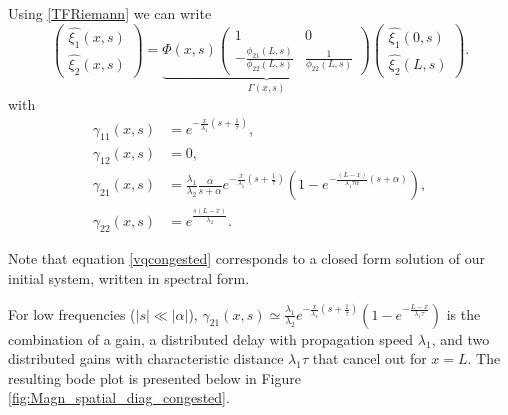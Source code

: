 \documentclass[preprint]{elsarticle}
\begin{document}
Using \eqref{TFRiemann} we can write 
\begin{equation} \label{vqcongested}
\begin{pmatrix}
\hat{\xi_{1}}(x,s)\\
\hat{\xi_{2}}(x,s)
\end{pmatrix} = \underbrace{
\Phi(x,s) \begin{pmatrix}
1 & 0\\
-\frac{\phi_{21}\left(L,s\right)}{\phi_{22}\left(L,s\right)} & \frac{1}{\phi_{22}\left(L,s\right)}
\end{pmatrix}}_\text{$\Gamma (x,s)$}
\begin{pmatrix}
\hat{\xi_{1}}\left(0,s\right)\\
\hat{\xi_{2}}\left(L,s\right)
\end{pmatrix}.
\end{equation}
with 
\begin{subequations}
\begin{align}
\gamma_{11}\left(x,s\right)&=
e^{-\frac{x}{\lambda_{1}}\left(s+\frac{1}{\tau}\right)} ,\\
\gamma_{12}\left(x,s\right)&=0, \\
\gamma_{21}\left(x,s\right)&=
\frac{\lambda_{1}}{\lambda_{2}}
\frac{\alpha}{s + \alpha}
e^{-\frac{x}{\lambda_{1}} \left( s + \frac{1}{\tau} \right)}
\left(
	1 -
	e^{-\frac{\left(L - x\right)
		}{
		\lambda_{1}\tau\alpha
		}
		\left(s+\alpha\right)
		}
\right)
, \\
\gamma_{22}\left(x,s\right)&=e^{\frac{s\left(L-x\right)}{\lambda_{2}}}.
\end{align}
\end{subequations}

Note that equation \eqref{vqcongested} corresponds to a closed form solution of our initial system, written in spectral form.

For low frequencies ($\left|s\right|\ll\left|\alpha\right|$), 
$\gamma_{21}\left(x,s\right)
\simeq
\frac{\lambda_{1}}{\lambda_{2}}
e^{-\frac{x}{\lambda_{1}} \left( s + \frac{1}{\tau} \right)}
\left(
	1 -
	e^{-\frac{L-x}{\lambda_{1}\tau}}
\right)
$
is the combination of a gain, a distributed delay with propagation speed $\lambda_{1}$, and two distributed gains with characteristic distance $\lambda_{1}\tau$ that cancel out for $x = L$. The resulting bode plot is presented below in Figure \ref{fig:Magn_spatial_diag_congested}.
\end{document}
